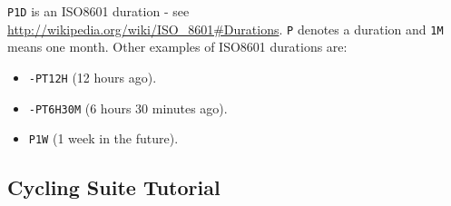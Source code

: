 \lstinline=P1D= is an ISO8601 duration - see
    \url{http://wikipedia.org/wiki/ISO_8601#Durations}. \lstinline=P= denotes a
    duration and \lstinline=1M= means one month. Other examples of ISO8601
    durations are:
\begin{itemize}
    \item \lstinline{-PT12H} (12 hours ago).
    \item \lstinline{-PT6H30M} (6 hours 30 minutes ago).
    \item \lstinline{P1W} (1 week in the future).
\end{itemize}

\subsection{Cycling Suite Tutorial}

